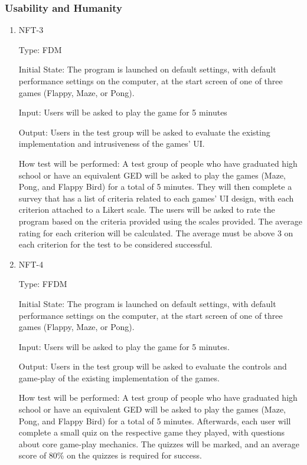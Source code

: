 \documentclass[12pt, titlepage]{article}
\begin{document}
\subsubsection{Usability and Humanity}

\begin{enumerate}

\item{NFT-3\\}

Type: FDM
					
Initial State: The program is launched on default settings, with default performance settings on the computer, at the start screen of one of three games (Flappy, Maze, or Pong).
					
Input: Users will be asked to play the game for 5 minutes
					
Output: Users in the test group will be asked to evaluate the existing implementation and intrusiveness of the games' UI.

How test will be performed: A test group of people who have graduated high school or have an equivalent GED will be asked to play the games (Maze, Pong, and Flappy Bird) for a total of 5 minutes. They will then complete a survey that has a list of criteria related to each games' UI design, with each criterion attached to a Likert scale. The users will be asked to rate the program based on the criteria provided using the scales provided.  The average rating for each criterion will be calculated. The average must be above 3 on each criterion for the test to be considered successful. 



\item{NFT-4\\}

Type: FFDM
					
Initial State: The program is launched on default settings, with default performance settings on the computer, at the start screen of one of three games (Flappy, Maze, or Pong).
					
Input: Users will be asked to play the game for 5 minutes.
					
Output: Users in the test group will be asked to evaluate the controls and game-play of the existing implementation of the games.

How test will be performed: A test group of people who have graduated high school or have an equivalent GED will be asked to play the games (Maze, Pong, and Flappy Bird) for a total of 5 minutes. Afterwards, each user will complete a small quiz on the respective game they played, with questions about core game-play mechanics. The quizzes will be marked, and an average score of 80\% on the quizzes is required for success.


\end{enumerate}
\end{document}
